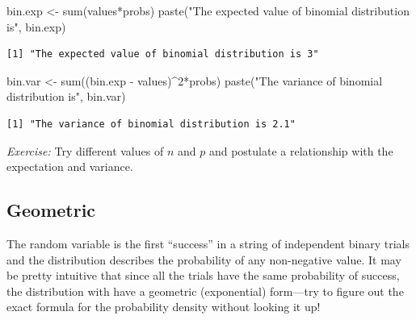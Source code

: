 \documentclass[
  letterpaper,
  DIV=11,
  numbers=noendperiod]{scrreprt}
\newenvironment{Shaded}{\begin{snugshade}}{\end{snugshade}}
\newcommand{\DecValTok}[1]{\textcolor[rgb]{0.68,0.00,0.00}{#1}}
\newcommand{\FunctionTok}[1]{\textcolor[rgb]{0.28,0.35,0.67}{#1}}
\newcommand{\NormalTok}[1]{\textcolor[rgb]{0.00,0.23,0.31}{#1}}
\newcommand{\OtherTok}[1]{\textcolor[rgb]{0.00,0.23,0.31}{#1}}
\newcommand{\SpecialCharTok}[1]{\textcolor[rgb]{0.37,0.37,0.37}{#1}}
\newcommand{\StringTok}[1]{\textcolor[rgb]{0.13,0.47,0.30}{#1}}
\begin{document}
\begin{Shaded}
\begin{Highlighting}[]
\NormalTok{bin.exp }\OtherTok{\textless{}{-}} \FunctionTok{sum}\NormalTok{(values}\SpecialCharTok{*}\NormalTok{probs)}
\FunctionTok{paste}\NormalTok{(}\StringTok{"The expected value of binomial distribution is"}\NormalTok{, bin.exp)}
\end{Highlighting}
\end{Shaded}

\begin{verbatim}
[1] "The expected value of binomial distribution is 3"
\end{verbatim}

\begin{Shaded}
\begin{Highlighting}[]
\NormalTok{bin.var }\OtherTok{\textless{}{-}} \FunctionTok{sum}\NormalTok{((bin.exp }\SpecialCharTok{{-}}\NormalTok{ values)}\SpecialCharTok{\^{}}\DecValTok{2}\SpecialCharTok{*}\NormalTok{probs)}
\FunctionTok{paste}\NormalTok{(}\StringTok{"The variance of binomial distribution is"}\NormalTok{, bin.var)}
\end{Highlighting}
\end{Shaded}

\begin{verbatim}
[1] "The variance of binomial distribution is 2.1"
\end{verbatim}

\emph{Exercise:} Try different values of \(n\) and \(p\) and postulate a
relationship with the expectation and variance.

\hypertarget{geometric}{%
\subsection{Geometric}\label{geometric}}

The random variable is the first ``success'' in a string of independent
binary trials and the distribution describes the probability of any
non-negative value. It may be pretty intuitive that since all the trials
have the same probability of success, the distribution with have a
geometric (exponential) form---try to figure out the exact formula for
the probability density without looking it up!
\end{document}
